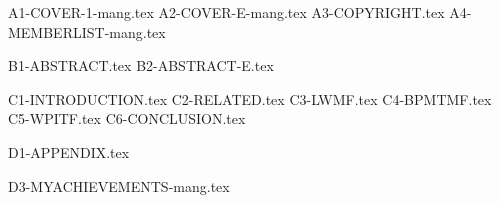 \documentclass[12pt,openany,a4paper,fancyhdr,oneside]{ctexbook}
\newcommand{\loflabel}{图}%
\newcommand{\lotlabel}{表}
\begin{document}
 {A1-COVER-1-mang.tex}
 {A2-COVER-E-mang.tex}
 {A3-COPYRIGHT.tex}
 {A4-MEMBERLIST-mang.tex}


\newpage
{}
\pagestyle{plain}
 {B1-ABSTRACT.tex}
 {B2-ABSTRACT-E.tex}
\setcounter{secnumdepth}{3}

\setcounter{tocdepth}{2}
\tableofcontents


\clearpage
\phantom{s}
\clearpage

\renewcommand{\numberline}[1]{\loflabel~#1\hspace*{1em}}%
\listoffigures%

\renewcommand{\numberline}[1]{\lotlabel~#1\hspace*{1em}}
\listoftables



\clearpage
\phantom{s}
\clearpage




\newpage
{}
\pagestyle{fancy}


\setlength{\baselineskip}{25pt}  %

 {C1-INTRODUCTION.tex}
 {C2-RELATED.tex}
 {C3-LWMF.tex}
 {C4-BPMTMF.tex}
 {C5-WPITF.tex}
 {C6-CONCLUSION.tex}



\clearpage



%

\begin{spacing}{1.2}


\end{spacing}
\clearpage
\phantom{s}
\clearpage

\pagestyle{plain}\clearpage
\pagestyle{plain}
\clearpage
{}
{}
 {D1-APPENDIX.tex}


\pagestyle{plain}
\clearpage 
{}


 {D3-MYACHIEVEMENTS-mang.tex}


\printindex
\end{document}
